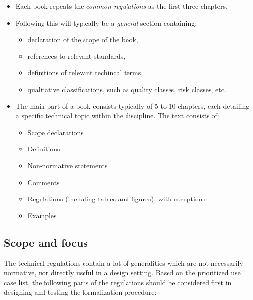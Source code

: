 \documentclass[]{article}
\providecommand{\tightlist}{%
  \setlength{\itemsep}{0pt}\setlength{\parskip}{0pt}}
\begin{document}
\begin{itemize}
\tightlist
\item
  Each book repeats the \emph{common regulations} as the first three
  chapters.
\item
  Following this will typically be a \emph{general} section containing:

  \begin{itemize}
  \tightlist
  \item
    declaration of the scope of the book,
  \item
    references to relevant standards,
  \item
    definitions of relevant techincal terms,
  \item
    qualitative classifications, such as quality classes, risk classes,
    etc.
  \end{itemize}
\item
  The main part of a book consists typically of 5 to 10 chapters, each
  detailing a specific technical topic within the discipline. The text
  consists of:

  \begin{itemize}
  \tightlist
  \item
    Scope declarations
  \item
    Definitions
  \item
    Non-normative statements
  \item
    Comments
  \item
    Regulations (including tables and figures), with exceptions
  \item
    Examples
  \end{itemize}
\end{itemize}

\subsection{Scope and focus}\label{scope-and-focus}

The technical regulations contain a lot of generalities which are not
necessarily normative, nor directly useful in a design setting. Based on
the prioritized use case list, the following parts of the regulations
should be considered first in designing and testing the formalization
procedure:
\end{document}
